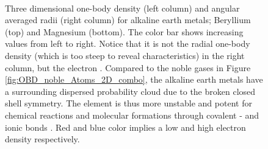 \begin{figure}
\begin{center}
     \\
  \caption{Three dimensional one-body density (left column) and angular averaged radii (right column) for alkaline earth metals; Beryllium (top) and Magnesium (bottom). The color bar shows increasing values from left to right. Notice that it is not the radial one-body density (which is too steep to reveal characteristics) in the right column, but the electron . Compared to the noble gases in Figure \ref{fig:OBD_noble_Atoms_2D_combo}, the alkaline earth metals have a surrounding dispersed probability cloud due to the broken closed shell symmetry. The element is thus more unstable and potent for chemical reactions and molecular formations through covalent - and ionic bonds \cite{UniversityPhysics}. Red and blue color implies a low and high electron density respectively.}
  \label{fig:OBD_alkaline_Atoms_2D_combo}
 \end{center}
\end{figure}
 
